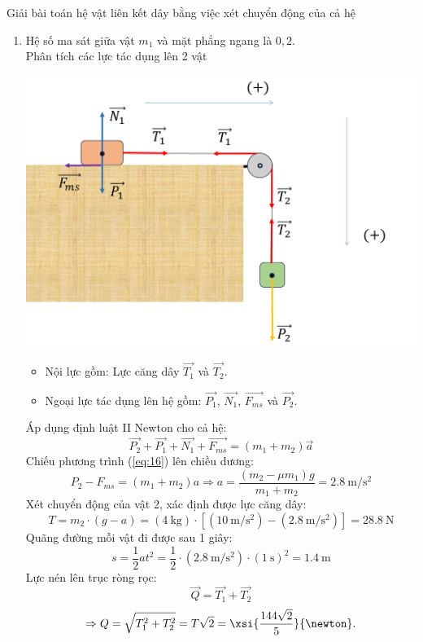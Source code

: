 \begin{dang}{Giải bài toán hệ vật liên kết dây bằng việc xét chuyển động của cả hệ}
{\begin{enumerate}[label=\alph*)]
	$$\Rightarrow Q=\sqrt{T^2_1+T^2_2}=T\sqrt{2}=\xsi{24\sqrt{2}}{\newton}.$$
		\item Hệ số ma sát giữa vật $m_1$ và mặt phẳng ngang là $0,2$.\\
		Phân tích các lực tác dụng lên 2 vật
		\begin{center}
			\includegraphics[width=0.6\linewidth]{../figs/VN10-2023-PH-TP021-3}
		\end{center}
		\begin{itemize}
			\item Nội lực gồm: Lực căng dây $\overrightarrow{T_1}$ và $\overrightarrow{T_2}$.
			\item Ngoại lực tác dụng lên hệ gồm: $\overrightarrow{P_1}$, $\overrightarrow{N_1}$, $\overrightarrow{F_{ms}}$ và $\overrightarrow{P_2}$.
		\end{itemize}
		Áp dụng định luật II Newton cho cả hệ:
		\begin{equation}
			\label{eq:16}
			\overrightarrow{P_2}+\overrightarrow{P_1}+\overrightarrow{N_1}+\overrightarrow{F_{ms}}=\left(m_1+m_2\right)\vec{a}
		\end{equation} 
		Chiếu phương trình (\ref{eq:16}) lên chiều dương:
		$$P_2-F_{ms}=\left(m_1+m_2\right)a \Rightarrow a=\dfrac{\left(m_2-\mu m_1\right)g}{m_1+m_2}=\SI{2.8}{\meter/\second^2}$$
		Xét chuyển động của vật 2, xác định được lực căng dây:
		$$T=m_2\cdot\left(g-a\right)=\left(\SI{4}{\kilogram}\right)\cdot\left[\left(\SI{10}{\meter/\second^2}\right)-\left(\SI{2.8}{\meter/\second^2}\right)\right]=\SI{28.8}{\newton}$$
		Quãng đường mỗi vật đi được sau 1 giây:
		$$s=\dfrac{1}{2}at^2=\dfrac{1}{2}\cdot\left(\SI{2.8}{\meter/\second^2}\right)\cdot\left(\SI{1}{\second}\right)^2=\SI{1.4}{\meter}$$
		Lực nén lên trục ròng rọc:
		$$\overrightarrow{Q}=\overrightarrow{T_1}+\overrightarrow{T_2}$$
		$$\Rightarrow Q=\sqrt{T^2_1+T^2_2}=T\sqrt{2}=\xsi{\dfrac{144\sqrt{2}}{5}}{\newton}.$$
	\end{enumerate}
}
\end{dang}

